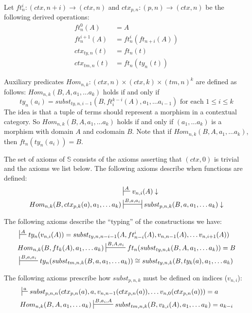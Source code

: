 \documentclass[reqno]{amsart}
\theoremstyle{definition}
\theoremstyle{remark}
\newcommand{\substTh}{\mathbb{S}}
\numberwithin{figure}{section}
\begin{document}
Let $ft^i_n : (ctx,n+i) \to (ctx,n)$ and $ctx_{p,n} : (p,n) \to (ctx,n)$ be the following derived operations:
\begin{align*}
ft^0_n(A) & = A \\
ft^{i+1}_n(A) & = ft^i_n(ft_{n+i}(A)) \\
ctx_{ty,n}(t) & = ft_n(t) \\
ctx_{tm,n}(t) & = ft_n(ty_n(t))
\end{align*}

Auxiliary predicates $Hom_{n,k} : (ctx,n) \times (ctx,k) \times (tm,n)^k$ are defined as follows: $Hom_{n,k}(B, A, a_1, \ldots a_k)$ holds if and only if
\[ ty_n(a_i) = subst_{ty,n,i-1}(B, ft^{k-i}_i(A), a_1, \ldots a_{i-1}) \text{ for each } 1 \leq i \leq k \]
The idea is that a tuple of terms should represent a morphism in a contextual category.
So $Hom_{n,k}(B, A, a_1, \ldots a_k)$ holds if and only if $(a_1, \ldots a_k)$ is a morphism with domain $A$ and codomain $B$.
Note that if $Hom_{n,k}(B, A, a_1, \ldots a_k)$, then $ft_n(ty_n(a_i)) = B$.

The set of axioms of $\substTh$ consists of the axioms asserting that $(ctx,0)$ is trivial and the axioms we list below.
The following axioms describe when functions are defined:
\begin{align}
\label{ax:def-var}
                                             & \sststile{}{A}           v_{n,i}(A) \downarrow \\
\label{ax:def-subst}
Hom_{n,k}(B, ctx_{p,k}(a), a_1, \ldots a_k)  & \ssststile{}{B, a, a_i}  subst_{p,n,k}(B, a, a_1, \ldots a_k) \downarrow
\end{align}

The following axioms describe the ``typing'' of the constructions we have:
\begin{align}
\label{ax:type-var}
& \sststile{}{A} ty_n(v_{n,i}(A)) = subst_{ty,n,n-i-1}(A, ft^i_{n-i}(A), v_{n,n-1}(A), \ldots v_{n,i+1}(A)) \\
\label{ax:type-subst-ty}
& Hom_{n,k}(B, ft_k(A), a_1, \ldots a_k) \sststile{}{B, A, a_i} ft_n(subst_{ty,n,k}(B, A, a_1, \ldots a_k)) = B \\
\label{ax:type-subst-tm}
& \sststile{}{B, a, a_i} ty_n(subst_{tm,n,k}(B, a, a_1, \ldots a_k)) \cong subst_{ty,n,k}(B, ty_k(a), a_1, \ldots a_k)
\end{align}

The following axioms prescribe how $subst_{p,n,k}$ must be defined on indices ($v_{n,i}$):
\begin{align}
\label{ax:subst-var}
& \sststile{}{a}         subst_{p,n,n}(ctx_{p,n}(a), a, v_{n,n-1}(ctx_{p,n}(a)), \ldots v_{n,0}(ctx_{p,n}(a))) = a \\
\label{ax:var-subst}
& Hom_{n,k}(B, A, a_1, \ldots a_k) \sststile{}{B, a_i, A} subst_{tm,n,k}(B, v_{k,i}(A), a_1, \ldots a_k) = a_{k-i}
\end{align}
\end{document}

